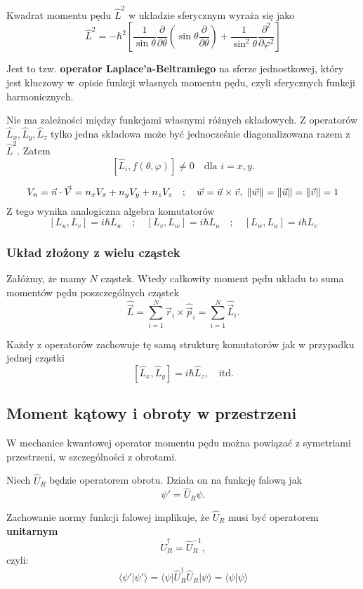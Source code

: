 Kwadrat momentu pędu $\hat{L}^2$ w układzie sferycznym wyraża się jako
$$
\hat{L}^2 = -\hbar^2 \left[ \frac{1}{\sin\theta} \frac{\partial}{\partial\theta} \left( \sin\theta \frac{\partial}{\partial\theta} \right) + \frac{1}{\sin^2\theta} \frac{\partial^2}{\partial\varphi^2} \right]
$$

Jest to tzw. \textbf{operator Laplace'a-Beltramiego} na sferze jednostkowej, który jest kluczowy w~opisie funkcji własnych momentu pędu, czyli sferycznych funkcji harmonicznych.

Nie ma zależności między funkcjami własnymi różnych składowych. Z operatorów $\hat{L}_x, \hat{L}_y, \hat{L}_z$ tylko jedna składowa może być jednocześnie diagonalizowana razem z $\hat{L}^2$. Zatem
$$
[\hat{L}_i, f(\theta, \varphi)] \ne 0 \quad \text{dla } i = x, y.
$$

$$
V_n = \vec{n} \cdot \vec{V} = n_x V_x + n_y V_y + n_z V_z \quad ; \quad \vec{w} = \vec{u} \times \vec{v}, \; \norm{\vec{w}} = \norm{\vec{u}} = \norm{\vec{v}} = 1
$$
Z tego wynika analogiczna algebra komutatorów
$$
[L_u, L_v] = i\hbar L_w \quad ; \quad [L_v, L_w] = i\hbar L_u \quad ; \quad [L_w, L_u] = i\hbar L_v
$$

\subsubsection*{Układ złożony z wielu cząstek}
Załóżmy, że mamy $N$ cząstek. Wtedy całkowity moment pędu układu to suma momentów pędu poszczególnych cząstek
$$
\hat{\vec{L}} = \sum_{i=1}^N \vec{r}_i \times \hat{\vec{p}}_i = \sum_{i=1}^N \hat{\vec{L}}_i.
$$

Każdy z operatorów zachowuje tę samą strukturę komutatorów jak w przypadku jednej cząstki
$$
[\hat{L}_x, \hat{L}_y] = i\hbar \hat{L}_z, \quad \text{itd.}
$$

\subsection{Moment kątowy i obroty w przestrzeni}
W mechanice kwantowej operator momentu pędu można powiązać z symetriami przestrzeni, w szczególności z obrotami.

Niech $\hat{U}_R$ będzie operatorem obrotu. Działa on na funkcję falową jak
$$
\psi' = \hat{U}_R \psi.
$$

Zachowanie normy funkcji falowej implikuje, że $\hat{U}_R$ musi być operatorem \textbf{unitarnym}
$$
\hat{U}_R^\dagger = \hat{U}_R^{-1},
$$
czyli:
$$
\langle \psi' | \psi' \rangle = \langle \psi | \hat{U}_R^\dagger \hat{U}_R | \psi \rangle = \langle \psi | \psi \rangle
$$

